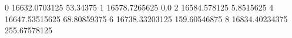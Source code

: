 0 16632.0703125 53.34375
1 16578.7265625 0.0
2 16584.578125 5.8515625
4 16647.53515625 68.80859375
6 16738.33203125 159.60546875
8 16834.40234375 255.67578125
